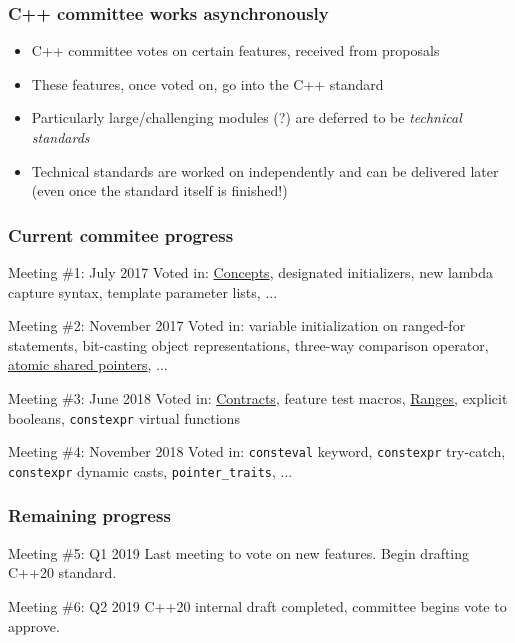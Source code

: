 \documentclass{beamer}
\begin{document}

\begin{frame}
\frametitle{C++ committee works asynchronously}
\begin{itemize} \setlength\itemsep{2 em} %
\item C++ committee votes on certain features, received from proposals
\item These features, once voted on, go into the C++ standard
\item Particularly large/challenging modules (?) are deferred to be \emph{technical standards}
\item Technical standards are worked on independently and can be delivered later (even once the standard itself is finished!)
\end{itemize}
\end{frame}


\begin{frame}
\frametitle{Current commitee progress}
{ 
\begin{block}{Meeting \#1: July 2017}
Voted in: \underline{Concepts}, designated initializers, new lambda capture syntax, template parameter lists, ...
\end{block}

\begin{block}{Meeting \#2: November 2017}
Voted in: variable initialization on ranged-for statements, bit-casting object representations, three-way comparison operator, \underline{atomic shared pointers}, ...
\end{block}

\begin{block}{Meeting \#3: June 2018}
Voted in: \underline{Contracts}, feature test macros, \underline{Ranges}, explicit booleans, \texttt{constexpr} virtual functions
\end{block}

\begin{block}{Meeting \#4: November 2018}
Voted in: \texttt{consteval} keyword, \texttt{constexpr} try-catch, \texttt{constexpr} dynamic casts, \texttt{pointer\_traits}, ...
\end{block}
}
\end{frame}

\begin{frame}
\frametitle{Remaining progress}
{ %
\begin{block}{Meeting \#5: Q1 2019}
Last meeting to vote on new features.
Begin drafting C++20 standard. 
\end{block}

\begin{block}{Meeting \#6: Q2 2019}
C++20 internal draft completed, committee begins vote to approve.
\end{block}
}
\end{frame}
\end{document}
